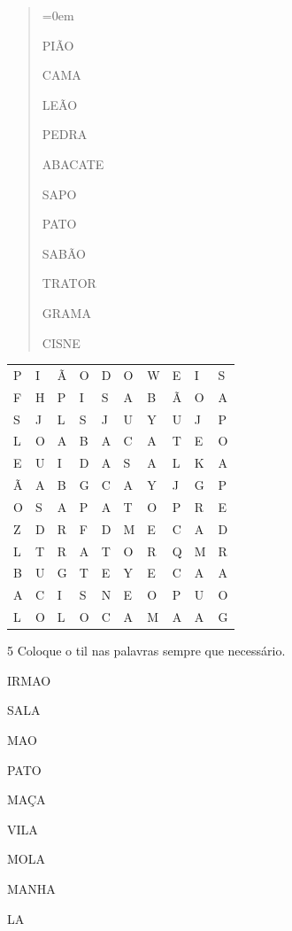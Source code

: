 \begin{quote}\parindent=0em
\vspace*{-.5cm}
\begin{multicols}{3}
PIÃO

CAMA

LEÃO

PEDRA

ABACATE

SAPO

PATO

SABÃO

TRATOR

GRAMA

CISNE
\end{multicols}
\end{quote}

\begin{longtable}[]{@{}llllllllll@{}}
\toprule
P & I & Ã & O & D & O & W & E & I & S\tabularnewline
F & H & P & I & S & A & B & Ã & O & A\tabularnewline
S & J & L & S & J & U & Y & U & J & P\tabularnewline
L & O & A & B & A & C & A & T & E & O\tabularnewline
E & U & I & D & A & S & A & L & K & A\tabularnewline
Ã & A & B & G & C & A & Y & J & G & P\tabularnewline
O & S & A & P & A & T & O & P & R & E\tabularnewline
Z & D & R & F & D & M & E & C & A & D\tabularnewline
L & T & R & A & T & O & R & Q & M & R\tabularnewline
B & U & G & T & E & Y & E & C & A & A\tabularnewline
A & C & I & S & N & E & O & P & U & O\tabularnewline
L & O & L & O & C & A & M & A & A & G\tabularnewline
\bottomrule
\end{longtable}


\num{5} Coloque o til nas palavras sempre que necessário.

\vspace*{+1em}


\begin{multicols}{3}
IRMAO

SALA

MAO

PATO

MAÇA

VILA

MOLA

MANHA

LA
\end{multicols}

